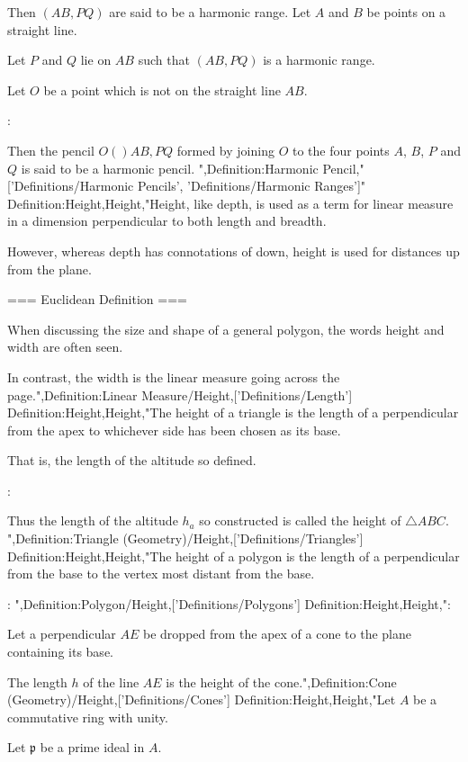 Then $\left( AB, PQ \right)$ are said to be a harmonic range.
Let $A$ and $B$ be points on a straight line.

Let $P$ and $Q$ lie on $AB$ such that $\left( AB, PQ \right)$ is a harmonic range.


Let $O$ be a point which is not on the straight line $AB$.


:


Then the pencil $O \left(   \right){AB, PQ}$ formed by joining $O$ to the four points $A$, $B$, $P$ and $Q$ is said to be a harmonic pencil.
",Definition:Harmonic Pencil,"['Definitions/Harmonic Pencils', 'Definitions/Harmonic Ranges']"
Definition:Height,Height,"Height, like depth, is used as a term for linear measure in a dimension perpendicular to both length and breadth.


However, whereas depth has connotations of down, height is used for distances up from the plane.


=== Euclidean Definition ===

When discussing the size and shape of a general polygon, the words height and width are often seen.



In contrast, the width is the linear measure going across the page.",Definition:Linear Measure/Height,['Definitions/Length']
Definition:Height,Height,"The height of a triangle is the length of a perpendicular from the apex to whichever side has been chosen as its base.


That is, the length of the altitude so defined.


:

Thus the length of the altitude $h_a$ so constructed is called the height of $\triangle ABC$.
",Definition:Triangle (Geometry)/Height,['Definitions/Triangles']
Definition:Height,Height,"The height of a polygon is the length of a perpendicular from the base to the vertex most distant from the base.



:
",Definition:Polygon/Height,['Definitions/Polygons']
Definition:Height,Height,":

Let a perpendicular $AE$ be dropped from the apex of a cone to the plane containing its base.

The length $h$ of the line $AE$ is the height of the cone.",Definition:Cone (Geometry)/Height,['Definitions/Cones']
Definition:Height,Height,"Let $A$ be a commutative ring with unity.

Let $\mathfrak p$ be a prime ideal in $A$.



